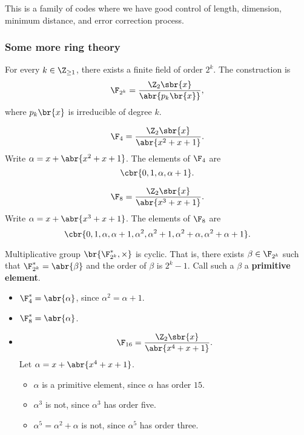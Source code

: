 
This is a family of codes where we have good control of length, dimension, minimum distance, and error correction process.

\subsubsection{Some more ring theory}

\begin{fact*}
For every $ k \in \Z_{\ge 1} $, there exists a finite field of order $ 2^k $. The construction is
$$ \F_{2^k} = \dfrac{\Z_2\sbr{x}}{\abr{p_k\br{x}}}, $$
where $ p_k\br{x} $ is irreducible of degree $ k $.
\end{fact*}

\begin{example*}
$$ \F_4 = \dfrac{\Z_2\sbr{x}}{\abr{x^2 + x + 1}}. $$
Write $ \alpha = x + \abr{x^2 + x + 1} $. The elements of $ \F_4 $ are
$$ \cbr{0, 1, \alpha, \alpha + 1}. $$
\end{example*}

\begin{example*}
$$ \F_8 = \dfrac{\Z_2\sbr{x}}{\abr{x^3 + x + 1}}. $$
Write $ \alpha = x + \abr{x^3 + x + 1} $. The elements of $ \F_8 $ are
$$ \cbr{0, 1, \alpha, \alpha + 1, \alpha^2, \alpha^2 + 1, \alpha^2 + \alpha, \alpha^2 + \alpha + 1}. $$
\end{example*}

\begin{fact*}
Multiplicative group $ \br{\F_{2^k}^*, \times} $ is cyclic. That is, there exists $ \beta \in \F_{2^k} $ such that $ \F_{2^k}^* = \abr{\beta} $ and the order of $ \beta $ is $ 2^k - 1 $. Call such a $ \beta $ a \textbf{primitive element}.
\end{fact*}

\begin{example*}
\hfill
\begin{itemize}
\item $ \F_4^* = \abr{\alpha} $, since $ \alpha^2 = \alpha + 1 $.
\item $ \F_8^* = \abr{\alpha} $.
\item
$$ \F_{16} = \dfrac{\Z_2\sbr{x}}{\abr{x^4 + x + 1}}. $$
Let $ \alpha = x + \abr{x^4 + x + 1} $.
\begin{itemize}
\item $ \alpha $ is a primitive element, since $ \alpha $ has order $ 15 $.
\item $ \alpha^3 $ is not, since $ \alpha^3 $ has order five.
\item $ \alpha^5 = \alpha^2 + \alpha $ is not, since $ \alpha^5 $ has order three.
\end{itemize}
\end{itemize}
\end{example*}

